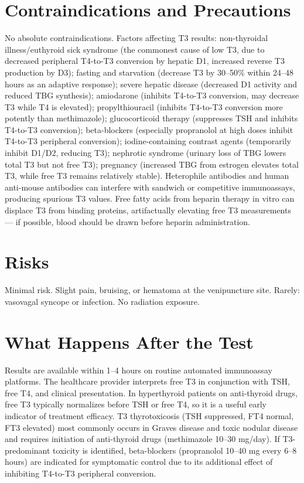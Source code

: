 \section*{Contraindications and Precautions}
No absolute contraindications. Factors affecting T3 results: non-thyroidal illness/euthyroid sick syndrome (the commonest cause of low T3, due to decreased peripheral T4-to-T3 conversion by hepatic D1, increased reverse T3 production by D3); fasting and starvation (decrease T3 by 30--50\% within 24--48 hours as an adaptive response); severe hepatic disease (decreased D1 activity and reduced TBG synthesis); amiodarone (inhibits T4-to-T3 conversion, may decrease T3 while T4 is elevated); propylthiouracil (inhibits T4-to-T3 conversion more potently than methimazole); glucocorticoid therapy (suppresses TSH and inhibits T4-to-T3 conversion); beta-blockers (especially propranolol at high doses inhibit T4-to-T3 peripheral conversion); iodine-containing contrast agents (temporarily inhibit D1/D2, reducing T3); nephrotic syndrome (urinary loss of TBG lowers total T3 but not free T3); pregnancy (increased TBG from estrogen elevates total T3, while free T3 remains relatively stable). Heterophile antibodies and human anti-mouse antibodies can interfere with sandwich or competitive immunoassays, producing spurious T3 values. Free fatty acids from heparin therapy in vitro can displace T3 from binding proteins, artifactually elevating free T3 measurements --- if possible, blood should be drawn before heparin administration.

\section*{Risks}
Minimal risk. Slight pain, bruising, or hematoma at the venipuncture site. Rarely: vasovagal syncope or infection. No radiation exposure.

\section*{What Happens After the Test}
Results are available within 1--4 hours on routine automated immunoassay platforms. The healthcare provider interprets free T3 in conjunction with TSH, free T4, and clinical presentation. In hyperthyroid patients on anti-thyroid drugs, free T3 typically normalizes before TSH or free T4, so it is a useful early indicator of treatment efficacy. T3 thyrotoxicosis (TSH suppressed, FT4 normal, FT3 elevated) most commonly occurs in Graves disease and toxic nodular disease and requires initiation of anti-thyroid drugs (methimazole 10--30 mg/day). If T3-predominant toxicity is identified, beta-blockers (propranolol 10--40 mg every 6--8 hours) are indicated for symptomatic control due to its additional effect of inhibiting T4-to-T3 peripheral conversion.

